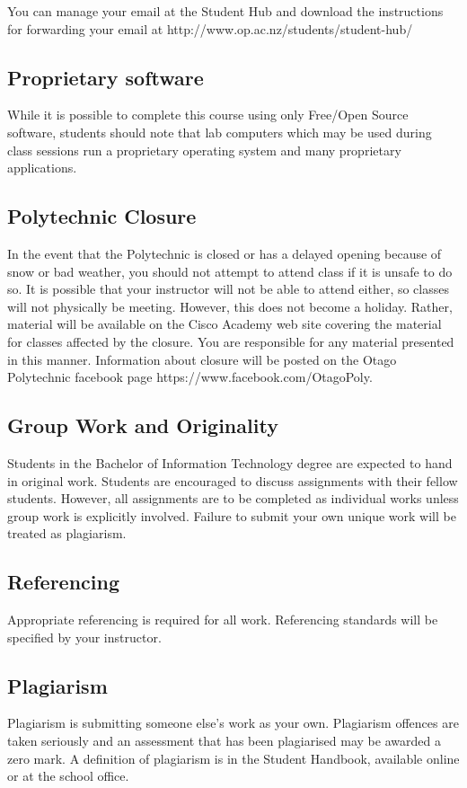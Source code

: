 \documentclass{article}
\begin{document}
You can manage your email at the Student Hub and download the instructions for forwarding your email at http://www.op.ac.nz/students/student-hub/

\subsection*{Proprietary software}
While it is possible to complete this course using only Free/Open Source software, students should note that lab computers which may be used during class sessions run a proprietary operating system and many proprietary applications.

\subsection*{Polytechnic Closure}
In the event that the Polytechnic is closed or has a delayed opening because of snow or bad weather, you should not attempt to attend class if it is unsafe to do so. It is possible that your instructor will not be able to attend either, so classes will not physically be meeting. However, this does not become a holiday. Rather, material will be available on the Cisco Academy web site covering the material for classes affected by the closure. You are responsible for any material presented in this manner. Information about closure will be posted on the Otago Polytechnic facebook page https://www.facebook.com/OtagoPoly.

\subsection*{Group Work and Originality}
Students in the Bachelor of Information Technology degree are expected to hand in original work.  Students are encouraged to discuss
assignments with their fellow students.  However, all assignments are to be completed as individual works unless group work is explicitly involved.
Failure to submit your own unique work will be treated as plagiarism.

\subsection*{Referencing}
Appropriate referencing is required for all work.  Referencing standards will be specified by your instructor.

\subsection*{Plagiarism}
Plagiarism is submitting someone else's work as your own.  Plagiarism offences are taken seriously and an
assessment that has been plagiarised may be awarded a zero mark.  A definition of plagiarism is in the Student Handbook,
available online or at the school office.
\end{document}
